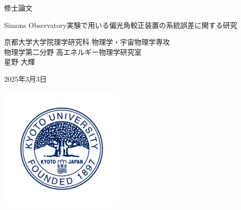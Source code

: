 \documentclass[../../main.tex]{subfiles}
\begin{document}
\begin{titlepage}
    \begin{center}
        \vspace*{5cm}

        \Large{修士論文}\\

        \vspace{0.2cm}

        \huge{Simons Observatory実験で用いる偏光角較正装置の系統誤差に関する研究}\\

        \vspace{1.5cm}

        \Large{京都大学大学院理学研究科 物理学・宇宙物理学専攻\\
        物理学第二分野 高エネルギー物理学研究室\\
        星野 大輝}

        \vspace{1cm}
        2025年3月3日

        \vspace{2cm}

        \includegraphics[width=6cm]{title/ku_logo.png}
    \end{center}
\end{titlepage}
\end{document}
